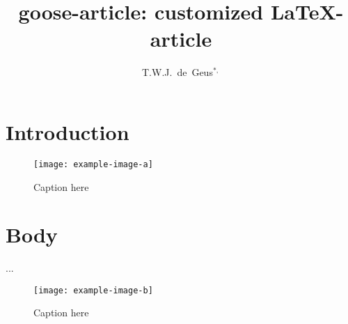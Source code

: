\documentclass{goose-article}
\title{goose-article: customized \LaTeX-article}
\author[1]{T.W.J.~de~Geus$^{*,}$}
\affil[1]{
  Physics Institute, \'{E}cole Polytechnique F\'{e}d\'{e}rale de Lausanne (EPFL) \nl
  Switzerland
}
\begin{document}
\maketitle

\begin{abstract}
\noindent
\lipsum[1]

\end{abstract}

\section{Introduction}
\lipsum[2-4] \citep{Geus10,Geus11,Geus12,Geus13,Geus14,Geus15,Geus16,Geus17}

\begin{figure}[htp]
  \centering
  \texttt{[image: example-image-a]}
  \caption{Caption here}
  \label{fig:a}
\end{figure}

\section{Body}
\lipsum[5-10] \citet{Geus10,Geus11,Geus12,Geus13,Geus14,Geus15,Geus16,Geus17} ...

\begin{figure}[htp]
  \centering
  \texttt{[image: example-image-b]}
  \caption{Caption here}
  \label{fig:b}
\end{figure}


\end{document}
